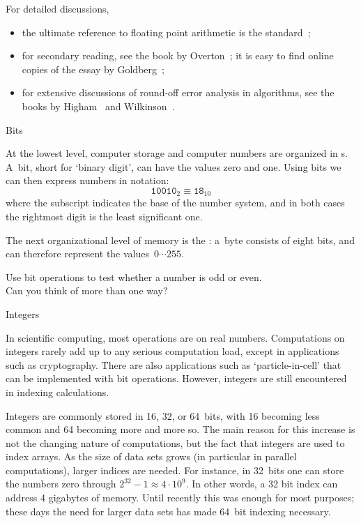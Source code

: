 For detailed discussions,
\begin{itemize}
\item the ultimate reference to floating point arithmetic
  is the  standard~\cite{754-2019};
\item for secondary reading,
  see the book by
  Overton~\cite{Overton:754book}; it is easy to find online copies of
  the essay by Goldberg~\cite{goldberg:floatingpoint};
\item for extensive
  discussions of round-off error analysis in algorithms, see the books
  by Higham~\cite{Higham:2002:ASN} and Wilkinson~\cite{Wilkinson:roundoff}.
\end{itemize}

 {Bits}
\label{sec:bits}

At the lowest level, computer storage and computer numbers
are organized in s.
A~bit, short for `binary digit', can have the values zero and one.
Using bits we can then express numbers in  notation:
\begin{equation}
  \mathtt{10010}_2 \equiv \mathtt{18}_{10}
\end{equation}
where the subscript indicates the base of the number system,
and in both cases the rightmost digit is the least significant one.

The next organizational level of memory is the :
a~byte consists of eight bits, and can therefore represent
the values~$0\cdots 255$.

\begin{exercise}
  \label{ex:bit-even}
  Use bit operations to test whether a number is odd or even.\\
  Can you think of more than one way?
\end{exercise}

 {Integers}
\label{sec:int-rep}

In scientific computing, most operations are on real
numbers. Computations on integers rarely add up to any serious
computation load, except in applications such as cryptography.
There are also applications such as `particle-in-cell' that
can be implemented with bit operations.
However, integers are still encountered in indexing calculations.

Integers are commonly stored in 16, 32, or 64~bits, with 16 becoming
less common and 64 becoming more and more so. The main reason for this increase is
not the changing nature of computations, but the fact that integers
are used to index arrays. As the size of data sets grows (in
particular in parallel computations), larger indices are needed. For
instance, in 32~bits one can store the numbers zero through
$2^{32}-1\approx 4\cdot 10^9$. In other words, a 32 bit index can
address 4 gigabytes of memory. Until recently this was enough for most
purposes; these days the need for larger data sets has made 64~bit
indexing necessary.

